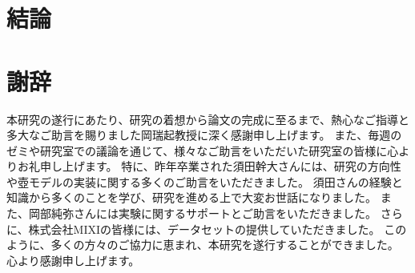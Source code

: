 \documentclass[uplatex,11pt,openany]{ujreport}
\renewcommand{\bibname}{参考文献}
\begin{document}
\chapter{結論}


\chapter*{謝辞}
    本研究の遂行にあたり、研究の着想から論文の完成に至るまで、熱心なご指導と多大なご助言を賜りました岡瑞起教授に深く感謝申し上げます。
    また、毎週のゼミや研究室での議論を通じて、様々なご助言をいただいた研究室の皆様に心よりお礼申し上げます。
    特に、昨年卒業された須田幹大さんには、研究の方向性や壺モデルの実装に関する多くのご助言をいただきました。
    須田さんの経験と知識から多くのことを学び、研究を進める上で大変お世話になりました。
    また、岡部純弥さんには実験に関するサポートとご助言をいただきました。
    さらに、株式会社MIXIの皆様には、データセットの提供していただきました。
    このように、多くの方々のご協力に恵まれ、本研究を遂行することができました。
    心より感謝申し上げます。


\newpage


% 
% 





\end{document}
